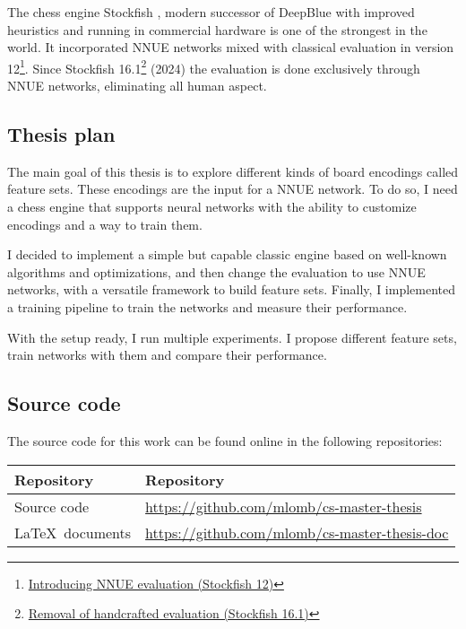 The chess engine Stockfish \cite{stockfish}, modern successor of DeepBlue with improved heuristics and running in commercial hardware is one of the strongest in the world. It incorporated NNUE networks mixed with classical evaluation in version 12\footnote[1]{\href{https://stockfishchess.org/blog/2020/introducing-nnue-evaluation/}{Introducing NNUE evaluation (Stockfish 12)}}. Since Stockfish 16.1\footnote[2]{\href{https://stockfishchess.org/blog/2024/stockfish-16-1/}{Removal of handcrafted evaluation (Stockfish 16.1)}} (2024) the evaluation is done exclusively through NNUE networks, eliminating all human aspect.

\newpage
\subsection{Thesis plan}

The main goal of this thesis is to explore different kinds of board encodings called feature sets. These encodings are the input for a NNUE network. To do so, I need a chess engine that supports neural networks with the ability to customize encodings and a way to train them.

I decided to implement a simple but capable classic engine based on well-known algorithms and optimizations, and then change the evaluation to use NNUE networks, with a versatile framework to build feature sets. Finally, I implemented a training pipeline to train the networks and measure their performance.

With the setup ready, I run multiple experiments. I propose different feature sets, train networks with them and compare their performance.

\subsection{Source code}

The source code for this work can be found online in the following repositories:

\begin{table}[H]
\centering
\begin{tabular}{ll}
\toprule
\textbf{Repository} & \textbf{Repository} \\
\midrule
Source code & \url{https://github.com/mlomb/cs-master-thesis} \\
\LaTeX\ documents & \url{https://github.com/mlomb/cs-master-thesis-doc}
\end{tabular}
\end{table}
